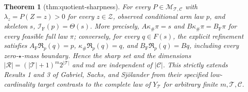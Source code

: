 \documentclass{article}
\newtheorem{theorem}{Theorem}
\begin{document}
\begin{theorem}[thm:quotient-sharpness]\label{thm:quotient-sharpness}
For every \(P\in\mathcal M_{\mathcal T,\mathcal C}\) with \(\lambda_z=P(Z=z)>0\) for every \(z\in\mathcal Z\), observed conditional arm law \(p\), and skeleton \(s\), \(\mathcal I_{\mathrm F}(p)=\Theta(s)\). More precisely, \(A\kappa_{\#}\pi=s\) and \(B\kappa_{\#}\pi=B_{\mathrm F}\pi\) for every feasible full law \(\pi\); conversely, for every \(q\in F(s)\), the explicit refinement satisfies \(A_{\mathrm F}\mathfrak R_p(q)=p\), \(\kappa_{\#}\mathfrak R_p(q)=q\), and \(B_{\mathrm F}\mathfrak R_p(q)=Bq\), including every zero-\(\star\)-mass boundary. Hence the sharp set and the dimensions \(|\mathcal R|=(|\mathcal T|+1)^m2^{|\mathcal T|}\) and \(md\) are independent of \(|\mathcal C|\). This strictly extends Results 1 and 3 of Gabriel, Sachs, and Sjölander from their specified low-cardinality target contrasts to the complete law of \(Y_{\mathcal T}\) for arbitrary finite \(m,\mathcal T,\mathcal C\).
\end{theorem}
\end{document}
